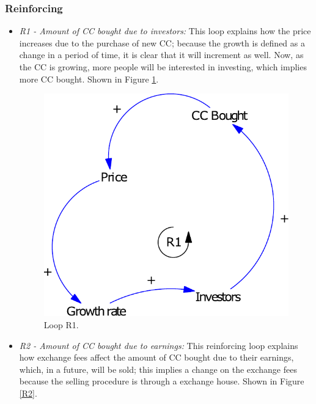 \subsubsection{Reinforcing}
	\begin{itemize}
	\item \textit{R1 - Amount of CC bought due to investors:} This loop explains how the price increases due to the purchase of new CC; because the growth is defined as a change in a period of time, it is clear that it will increment as well. Now, as the CC is growing, more people will be interested in investing, which implies more CC bought. Shown in Figure \ref{R1}.
	\begin{figure}[H]
		\centering
        \includegraphics[scale=0.5]{files/R1.pdf}
        \caption{Loop R1.}
        \label{R1}
	\end{figure}
    \item \textit{R2 - Amount of CC bought due to earnings:} This reinforcing loop explains how exchange fees affect the amount of CC bought due to their earnings, which, in a future, will be sold; this implies a change on the exchange fees because the selling procedure is through a exchange house. Shown in Figure \ref{R2}.
    \begin{figure}[H]
		\centering

\end{figure}
\end{itemize}
